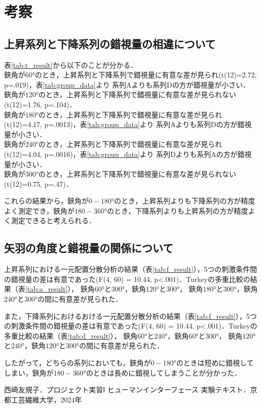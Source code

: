 \documentclass{jlreq}
\numberwithin{equation}{section}
\begin{document}
\section{考察}
\subsection{上昇系列と下降系列の錯視量の相違について}
表\ref{tab:t_result}から以下のことが分かる．\\
鋏角が$60\si{\degree}$のとき，上昇系列と下降系列で錯視量に有意な差が見られ(t(12)=2.72, p=.019)，表\ref{tab:group_data}より
系列Aよりも系列Dの方が錯視量が小さい．\\
鋏角が$120\si{\degree}$のとき，上昇系列と下降系列で錯視量に有意な差が見られない(t(12)=1.76, p=.104)．\\
鋏角が$180\si{\degree}$のとき，上昇系列と下降系列で錯視量に有意な差が見られ(t(12)=4.17, p=.0013)，表\ref{tab:group_data}より
系列Aよりも系列Dの方が錯視量が小さい．\\
鋏角が$240\si{\degree}$のとき，上昇系列と下降系列で錯視量に有意な差が見られ(t(12)=4.04, p=.0016)，表\ref{tab:group_data}より
系列Dよりも系列Aの方が錯視量が小さい．\\
鋏角が$300\si{\degree}$のとき，上昇系列と下降系列で錯視量に有意な差が見られない(t(12)=0.75, p=.47)．

これらの結果から，鋏角が$0-180\si{\degree}$のとき，上昇系列よりも下降系列の方が精度よく測定でき，鋏角が$180-360\si{\degree}$のとき，下降系列よりも上昇系列の方が精度よく測定できると考えられる．

\subsection{矢羽の角度と錯視量の関係について}
上昇系列における一元配置分散分析の結果（表\ref{tab:f_result}），5つの刺激条件間の錯視量の差は有意であった(F(4, 60) = 10.44, p<.001)．Turkeyの多重比較の結果（表\ref{tab:a_result}），
鋏角$60\si{\degree}$と$300\si{\degree}$，鋏角$120\si{\degree}$と$300\si{\degree}$，
鋏角$180\si{\degree}$と$300\si{\degree}$，鋏角$240\si{\degree}$と$300\si{\degree}$の間に有意差が見られた．

また，下降系列におけるおける一元配置分散分析の結果（表\ref{tab:f_result}），5つの刺激条件間の錯視量の差は有意であった(F(4, 60) = 10.44, p<.001)．Turkeyの多重比較の結果（表\ref{tab:d_result}），
鋏角$60\si{\degree}$と$240\si{\degree}$，鋏角$60\si{\degree}$と$300\si{\degree}$，
鋏角$120\si{\degree}$と$240\si{\degree}$，鋏角$120\si{\degree}$と$300\si{\degree}$の間に有意差が見られた．

したがって，どちらの系列においても，鋏角が$0-180\si{\degree}$のときは短めに錯視してしまい，鋏角が$180-360\si{\degree}$のときは長めに錯視してしまうことが分かった．

\begin{thebibliography}{9}
  \item 西崎友規子．プロジェクト実習Ⅰ ヒューマンインターフェース 実験テキスト．京都工芸繊維大学，2024年
\end{thebibliography}
\end{document}
